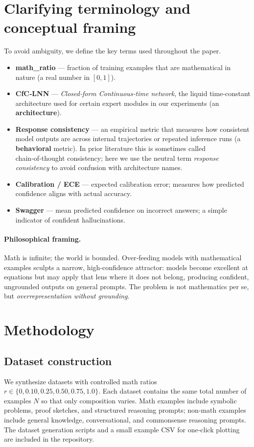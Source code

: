 \documentclass[11pt,a4paper]{article}
\begin{document}
\section{Clarifying terminology and conceptual framing}
To avoid ambiguity, we define the key terms used throughout the paper.

\begin{itemize}[noitemsep]
  \item \textbf{math\_ratio} --- fraction of training examples that are mathematical in nature (a real number in $[0,1]$).
  \item \textbf{CfC‑LNN} --- \emph{Closed‑form Continuous‑time network}, the liquid time‑constant architecture used for certain expert modules in our experiments (an \textbf{architecture}).
  \item \textbf{Response consistency} --- an empirical metric that measures how consistent model outputs are across internal trajectories or repeated inference runs (a \textbf{behavioral} metric). In prior literature this is sometimes called chain‑of‑thought consistency; here we use the neutral term \emph{response consistency} to avoid confusion with architecture names.
  \item \textbf{Calibration / ECE} --- expected calibration error; measures how predicted confidence aligns with actual accuracy.
  \item \textbf{Swagger} --- mean predicted confidence on incorrect answers; a simple indicator of confident hallucinations.
\end{itemize}

\paragraph{Philosophical framing.} Math is infinite; the world is bounded. Over‑feeding models with mathematical examples sculpts a narrow, high‑confidence attractor: models become excellent at equations but may apply that lens where it does not belong, producing confident, ungrounded outputs on general prompts. The problem is not mathematics per se, but \emph{overrepresentation without grounding}.

\section{Methodology}
\subsection{Dataset construction}
We synthesize datasets with controlled math ratios \(r\in\{0,0.10,0.25,0.50,0.75,1.0\}\). Each dataset contains the same total number of examples \(N\) so that only composition varies. Math examples include symbolic problems, proof sketches, and structured reasoning prompts; non‑math examples include general knowledge, conversational, and commonsense reasoning prompts. The dataset generation scripts and a small example CSV for one‑click plotting are included in the repository.
\end{document}
